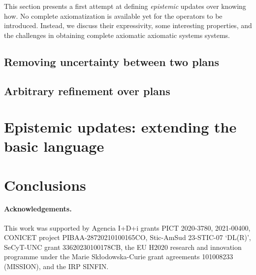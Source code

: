 \documentclass[sn-mathphys-num]{sn-jnl}%
\begin{document}
This section presents a first attempt at defining \emph{epistemic} updates over knowing how.  No complete axiomatization is available yet for the operators to be introduced. Instead, we  discuss their expressivity, some interesting properties, and the challenges in obtaining complete axiomatic axiomatic systems systems. 

\subsection{Removing uncertainty between two plans}
\label{sec:ref}


\subsection{Arbitrary refinement over plans}
\label{sec:aref}


% 

\section{Epistemic updates: extending the basic language}
\label{sec:extension}









% 



% 

\section{Conclusions}
\label{sec:final}


\paragraph{Acknowledgements.} 
This work was supported by Agencia I+D+i grants
 PICT 2020-3780,
 2021-00400, CONICET project PIBAA-28720210100165CO, 
 Stic-AmSud 23-STIC-07 ‘DL(R)', 
 SeCyT-UNC grant 33620230100178CB, 
 the EU
H2020 research and innovation programme under the
Marie Skłodowska-Curie grant agreements 101008233
(MISSION), and the IRP SINFIN.
\end{document}
